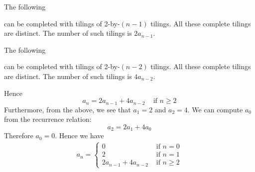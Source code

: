 The following


can be completed with tilings of 2-by-$(n-1)$ tilings.
All these complete tilings are distinct.
The number of such tilings is $2 a_{n-1}$.

The following




can be completed with tilings of 2-by-$(n-2)$ tilings.
All these complete tilings are distinct.
The number of such tilings is $4 a_{n-2}$.

Hence
\[
a_n = 2 a_{n-1} + 4 a_{n-2} \,\,\,\,\, \text{ if } n \geq 2
\]
Furthermore, from the above, we see that $a_1 = 2$ and $a_2 = 4$.
We can compute $a_0$ from the recurrence relation:
\[
a_2 = 2 a_{1} + 4 a_{0}
\]
Therefore
$a_0 = 0$.
Hence we have
\begin{align*}
  a_n =
  \begin{cases}
    0                   & \text{ if } n = 0 \\
    2                   & \text{ if } n = 1 \\
    2 a_{n-1} + 4 a_{n-2} & \text{ if } n \geq 2
  \end{cases}
\end{align*}
